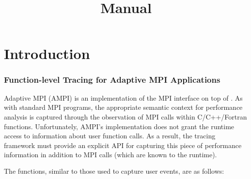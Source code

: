\documentclass[10pt]{article}
\title{\projections{} Manual}
\begin{document}
\maketitle

\section{Introduction}



\subsubsection{Function-level Tracing for Adaptive MPI Applications}
\label{sec::AMPI functions}

Adaptive MPI (AMPI) is an implementation of the MPI interface on top
of \charmpp{}. As with standard MPI programs, the appropriate semantic
context for performance analysis is captured through the observation
of MPI calls within C/C++/Fortran functions. Unfortunately, AMPI's
implementation does not grant the runtime access to information about
user function calls. As a result, the tracing framework must provide
an explicit API for capturing this piece of performance information in
addition to MPI calls (which are known to the runtime).

The functions, similar to those used to capture user events, are as
follows:
\end{document}
